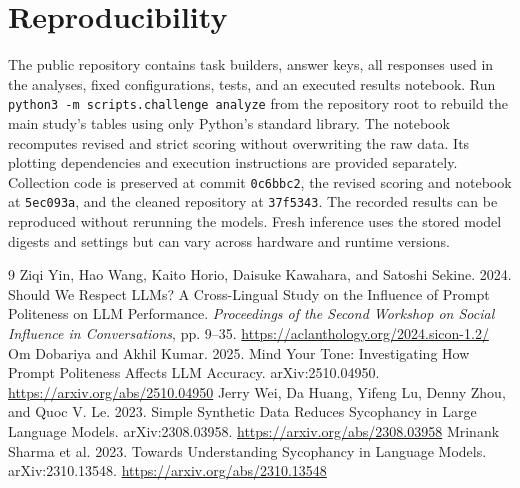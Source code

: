 \documentclass[11pt]{article}
\begin{document}
\section*{Reproducibility}
The public repository contains task builders, answer keys, all responses used in the analyses, fixed configurations, tests, and an executed results notebook. Run \texttt{python3 -m scripts.challenge analyze} from the repository root to rebuild the main study's tables using only Python's standard library. The notebook recomputes revised and strict scoring without overwriting the raw data. Its plotting dependencies and execution instructions are provided separately. Collection code is preserved at commit \texttt{0c6bbc2}, the revised scoring and notebook at \texttt{5ec093a}, and the cleaned repository at \texttt{37f5343}. The recorded results can be reproduced without rerunning the models. Fresh inference uses the stored model digests and settings but can vary across hardware and runtime versions.

\begin{thebibliography}{9}
 Ziqi Yin, Hao Wang, Kaito Horio, Daisuke Kawahara, and Satoshi Sekine. 2024. Should We Respect LLMs? A Cross-Lingual Study on the Influence of Prompt Politeness on LLM Performance. \emph{Proceedings of the Second Workshop on Social Influence in Conversations}, pp. 9--35. \url{https://aclanthology.org/2024.sicon-1.2/}
 Om Dobariya and Akhil Kumar. 2025. Mind Your Tone: Investigating How Prompt Politeness Affects LLM Accuracy. arXiv:2510.04950. \url{https://arxiv.org/abs/2510.04950}
 Jerry Wei, Da Huang, Yifeng Lu, Denny Zhou, and Quoc V. Le. 2023. Simple Synthetic Data Reduces Sycophancy in Large Language Models. arXiv:2308.03958. \url{https://arxiv.org/abs/2308.03958}
 Mrinank Sharma et al. 2023. Towards Understanding Sycophancy in Language Models. arXiv:2310.13548. \url{https://arxiv.org/abs/2310.13548}
\end{thebibliography}

\appendix
\end{document}
